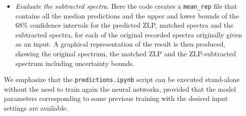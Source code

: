 \begin{itemize}
\item {\it Evaluate the subtracted spectra.}
%
Here the code creates a {\tt mean\_rep} file that contains
all the median predictions and the upper and lower bounds of the 68\% confidence intervals for 
the predicted ZLP, matched spectra and the subtracted spectra, for each of the original recorded
spectra originally given as an input. 
%
A graphical representation
of the result is then produced, showing the original spectrum, the matched
ZLP and the ZLP-subtracted spectrum including uncertainty bounds. 

\end{itemize}

We emphasize that the {\tt predictions.ipynb} script can be executed stand-alone
without the need to train again the neural networks, provided that
the model parameters corresponding to some previous training with
the desired input settings are available.



















